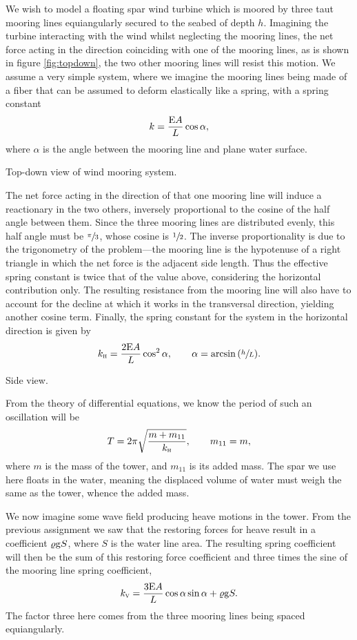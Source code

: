We wish to model a floating spar wind turbine which is moored by three taut mooring lines equiangularly secured to the seabed of depth $h$.
Imagining the turbine interacting with the wind whilst neglecting the mooring lines, the net force acting in the direction coinciding with one of the mooring lines, as is shown in figure \ref{fig:topdown}, the two other mooring lines will resist this motion.
We assume a very simple system, where we imagine the mooring lines being made of a fiber that can be assumed to deform elastically like a spring, with a spring constant
\[
    k = \frac{\mathrm{E} A}{L}\cos{\alpha},
\]
where $\alpha$ is the angle between the mooring line and plane water surface.
\begin{Figure}
    \centering
    \captionsetup{type = figure}
    
    \caption{Top-down view of wind mooring system.}
    \label{fig:topdown}
\end{Figure}
\noindent
The net force acting in the direction of that one mooring line will induce a reactionary in the two others, inversely proportional to the cosine of the half angle between them.
Since the three mooring lines are distributed evenly, this half angle must be $\sfrac{\pi}{3}$, whose cosine is $\sfrac{1}{2}$.
The inverse proportionality is due to the trigonometry of the problem---the mooring line is the hypotenuse of a right triangle in which the net force is the adjacent side length.
Thus the effective spring constant is twice that of the value above, considering the horizontal contribution only.
The resulting resistance from the mooring line will also have to account for the decline at which it works in the transversal direction, yielding another cosine term.
Finally, the spring constant for the system in the horizontal direction is given by
\[
    k_{\textsc{h}} = \frac{2 \mathrm{E} A}{L} \cos^2{\alpha}, \qquad \alpha = \arcsin{(\sfrac{h}{L})}.
\]
\begin{Figure}
    \centering
    \captionsetup{type = figure}
    
    \caption{Side view.}
    \label{fig:side}
\end{Figure}
From the theory of differential equations, we know the period of such an oscillation will be
\[
    T = 2\pi \sqrt{\frac{m + m_{11}}{k_{\textsc{h}}}}, \qquad m_{11} = m,
\]
where $m$ is the mass of the tower, and $m_{11}$ is its added mass.
The spar we use here floats in the water, meaning the displaced volume of water must weigh the same as the tower, whence the added mass.

We now imagine some wave field producing heave motions in the tower.
From the previous assignment we saw that the restoring forces for heave result in a coefficient $\varrho\mathrm{g} S$, where $S$ is the water line area.
The resulting spring coefficient will then be the sum of this restoring force coefficient and three times the sine of the mooring line spring coefficient,
\[
    k_{\textsc{v}} = \frac{3 \mathrm{E} A}{L}\cos{\alpha}\sin{\alpha} + \varrho\mathrm{g} S.
\]
The factor three here comes from the three mooring lines being spaced equiangularly.

